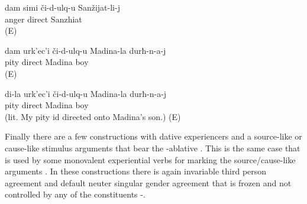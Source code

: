 \begin{exe} 
\ex	\label{ex:PITYangry}
\begin{xlist}
		\ex {} 
		\ex {} 
\end{xlist}

	\ex	\label{ex:‎‎I am angry with Sanzhiat}
	\gll	dam	simi	či-d-ulq-u	Sanžijat-li-j\\
			anger	direct	Sanzhiat\\
	\glt	{} (E)
	
			\ex	\label{ex:I pity Madina's sons@b}
		\gll	dam	urk'ec'i	či-d-ulq-u	Madina-la	durħ-n-a-j\\
				pity	direct Madina	boy\\
		\glt	{} (E)

		\ex	\label{ex:I pity Madina's sons@c}
		\gll	di-la	urk'ec'i	či-d-ulq-u	Madina-la	durħ-n-a-j\\
				pity	direct Madina	boy\\
		\glt	{} (lit. My pity id directed onto Madina's son.) (E)	
\end{exe}

Finally there are a few constructions with dative experiencers and a source-like or cause-like stimulus arguments that bear the -ablative . This is the same case that is used by some monovalent experiential verbs for marking the source/cause-like arguments . In these constructions there is again invariable third person agreement and default neuter singular gender agreement that is frozen and not controlled by any of the constituents -.

\begin{exe} 
\ex \label{embarrassed constructions}
	\begin{xlist}
		\ex	{}  
		\ex	{} 
		\ex	{} 
	\end{xlist}
	\end{exe}
	
